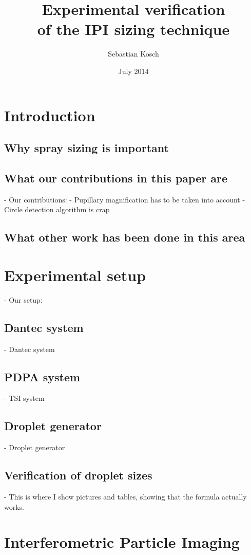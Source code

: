 \documentclass[10pt]{book}
\begin{document}
\title{Experimental verification\\ of the IPI sizing technique}
\author{Sebastian Kosch}
\date{July 2014}
\maketitle
\chapter{Introduction}
\section{Why spray sizing is important}
\section{What our contributions in this paper are}
- Our contributions:
    - Pupillary magnification has to be taken into account
    - Circle detection algorithm is crap
\section{What other work has been done in this area}

\chapter{Experimental setup}
- Our setup:
\section{Dantec system}
    - Dantec system
\section{PDPA system}
    - TSI system
\section{Droplet generator}
    - Droplet generator
\section{Verification of droplet sizes}
    - This is where I show pictures and tables, showing that the formula
    actually works.

\chapter{Interferometric Particle Imaging}
\end{document}
